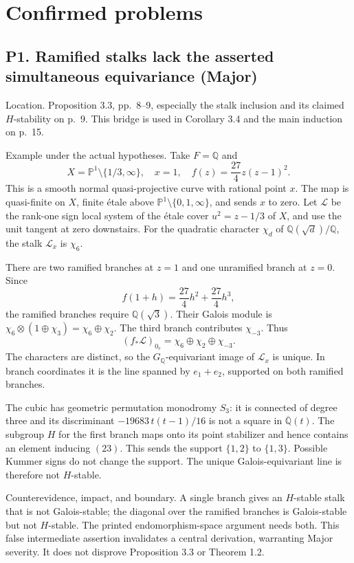 \documentclass[10pt]{article}
\begin{document}
\section*{Confirmed problems}
\subsection*{P1. Ramified stalks lack the asserted simultaneous equivariance (Major)}
Location. Proposition 3.3, pp. 8–9, especially the stalk inclusion and its claimed \(H\)-stability on p. 9. This bridge is used in Corollary 3.4 and the main induction on p. 15.\par
Example under the actual hypotheses. Take \(F=\mathbb Q\) and \[X=\mathbb P^1\setminus\{1/3,\infty\},\quad x=1,\quad
 f(z)=\frac{27}{4}z(z-1)^2 .\] This is a smooth normal quasi-projective curve with rational point \(x\). The map is quasi-finite on \(X\), finite étale above \(\mathbb P^1\setminus\{0,1,\infty\}\), and sends \(x\) to zero. Let \(\mathcal L\) be the rank-one sign local system of the étale cover \(u^2=z-1/3\) of \(X\), and use the unit tangent at zero downstairs. For the quadratic character \(\chi_d\) of \(\mathbb Q(\sqrt d)/\mathbb Q\), the stalk \(\mathcal L_x\) is \(\chi_6\).\par
There are two ramified branches at \(z=1\) and one unramified branch at \(z=0\). Since \[f(1+h)=\frac{27}{4}h^2+\frac{27}{4}h^3,\] the ramified branches require \(\mathbb Q(\sqrt3)\). Their Galois module is \(\chi_6\otimes(1\oplus\chi_3)=\chi_6\oplus\chi_2\). The third branch contributes \(\chi_{-3}\). Thus \[(f_*\mathcal L)_{0_v}
     =\chi_6\oplus\chi_2\oplus\chi_{-3}.\] The characters are distinct, so the \(G_\mathbb Q\)-equivariant image of \(\mathcal L_x\) is unique. In branch coordinates it is the line spanned by \(e_1+e_2\), supported on both ramified branches.\par
The cubic has geometric permutation monodromy \(S_3\): it is connected of degree three and its discriminant \(-19683\,t(t-1)/16\) is not a square in \(\overline{\mathbb Q}(t)\). The subgroup \(H\) for the first branch maps onto its point stabilizer and hence contains an element inducing \((23)\). This sends the support \(\{1,2\}\) to \(\{1,3\}\). Possible Kummer signs do not change the support. The unique Galois-equivariant line is therefore not \(H\)-stable.\par
Counterevidence, impact, and boundary. A single branch gives an \(H\)-stable stalk that is not Galois-stable; the diagonal over the ramified branches is Galois-stable but not \(H\)-stable. The printed endomorphism-space argument needs both. This false intermediate assertion invalidates a central derivation, warranting Major severity. It does not disprove Proposition 3.3 or Theorem 1.2.\par
\end{document}

